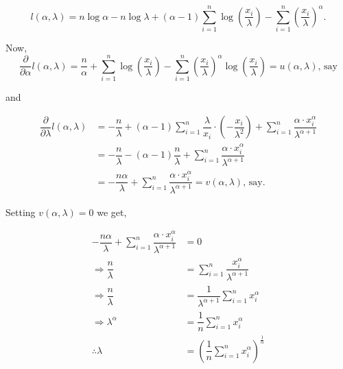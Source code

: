 \documentclass[11pt, a4paper]{article}\usepackage[]{graphicx}\usepackage[]{xcolor}
\begin{document}
$$l(\alpha, \lambda) = n \log \alpha - n \log \lambda + (\alpha - 1) \sum_{i=1}^{n} \log \left( \frac{x_i}{\lambda} \right) - \sum_{i=1}^{n} \left( \frac{x_i}{\lambda} \right)^{\alpha}.$$

Now, 
\begin{equation}
\dfrac{\partial}{\partial \alpha} l(\alpha, \lambda) = \dfrac{n}{\alpha} + \sum \limits_{i=1}^{n} \log \left( \dfrac{x_i}{\lambda} \right) - \sum \limits_{i=1}^{n} \left( \dfrac{x_i}{\lambda} \right)^{\alpha} \log \left( \dfrac{x_i}{\lambda} \right) = u(\alpha, \lambda) \text{, say}
\end{equation}

\newpage

and

\begin{align*}
\dfrac{\partial}{\partial \lambda} l(\alpha, \lambda) &= -\dfrac{n}{\lambda} + (\alpha - 1) \sum \limits_{i=1}^{n} \dfrac{\lambda}{x_i} \cdot \left( -\dfrac{x_i}{\lambda^2} \right) + \sum \limits_{i=1}^{n} \dfrac{\alpha \cdot x_i^{\alpha}}{\lambda^{\alpha + 1}}\\[0.3cm]
&= -\dfrac{n}{\lambda} - (\alpha - 1) \dfrac{n}{\lambda} + \sum \limits_{i=1}^{n} \dfrac{\alpha \cdot x_i^{\alpha}}{\lambda^{\alpha + 1}}\\[0.3cm]
&= -\dfrac{n \alpha}{\lambda} + \sum \limits_{i=1}^{n} \dfrac{\alpha \cdot x_i^{\alpha}}{\lambda^{\alpha + 1}} = v(\alpha, \lambda) \text{, say}.
\end{align*}

Setting $v(\alpha, \lambda) = 0$ we get,


\begin{align*}
-\dfrac{n \alpha}{\lambda} + \sum \limits_{i=1}^{n} \dfrac{\alpha \cdot x_i^{\alpha}}{\lambda^{\alpha + 1}} &= 0 \nonumber \\
\Rightarrow \dfrac{n}{\lambda} &= \sum \limits_{i=1}^{n} \dfrac{x_i^{\alpha}}{\lambda^{\alpha + 1}} \nonumber \\
\Rightarrow \dfrac{n}{\lambda} &= \dfrac{1}{\lambda^{\alpha + 1}} \sum \limits_{i=1}^{n}{x_i^{\alpha}} \nonumber \\
\Rightarrow \lambda^{\alpha} &= \dfrac{1}{n} \sum \limits_{i=1}^{n}{x_i^{\alpha}} \nonumber \\
\therefore \lambda &= \left( \dfrac{1}{n} \sum \limits_{i=1}^{n}{x_i^{\alpha}} \right)^{\frac{1}{\alpha}} \tag{2} \\
\end{align*}

\setcounter{equation}{2}
\end{document}
